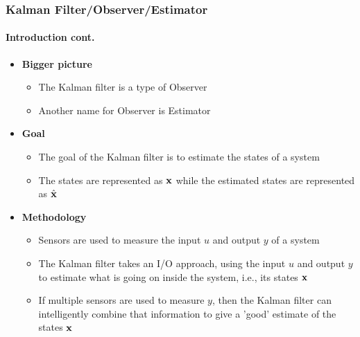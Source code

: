 \begin{frame}
\frametitle{Kalman Filter/Observer/Estimator}
\framesubtitle{Introduction \tiny cont.}

\scriptsize
\begin{itemize}
\item \textbf{Bigger picture}
\begin{itemize}\scriptsize
\item The Kalman filter is a type of {\color{blue}Observer}
\item Another name for Observer is Estimator
\end{itemize}
\item \textbf{Goal}
\begin{itemize}\scriptsize
\item The goal of the Kalman filter is to estimate the states of a system
\item The states are represented as $\textbf{x}$ while the estimated states are represented as $\hat{\textbf{x}}$
\end{itemize}
\item \textbf{Methodology}
\begin{itemize}\scriptsize
\item Sensors are used to measure the input $u$ and output $y$ of a system
\item The Kalman filter takes an I/O approach, using the input $u$ and output $y$ to estimate what is going on inside the system, i.e., its states $\textbf{x}$
\item If multiple sensors are used to measure $y$, then the Kalman filter can intelligently combine that information to give a 'good' estimate of the states $\textbf{x}$
\end{itemize}
\end{itemize}
\end{frame}




%


